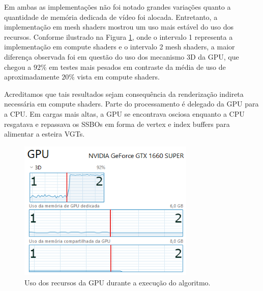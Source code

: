 Em ambas as implementações não foi notado grandes variações quanto a quantidade de memória dedicada de vídeo foi alocada. Entretanto, a implementação em mesh shaders mostrou um uso mais estável do uso dos recursos. Conforme ilustrado na Figura \ref{fig:LABEL_USO3D_GPU}, onde o intervalo 1 representa a implementação em compute shaders e o intervalo 2 mesh shaders, a maior diferença observada foi em questão do uso dos mecanismo 3D da GPU, que chegou a $92\%$ em testes mais pesados em contraste da média de uso de aproximadamente $20\%$ vista em compute shaders.

Acreditamos que tais resultados sejam consequência da renderização indireta necessária em compute shaders. Parte do processamento é delegado da GPU para a CPU. Em cargas mais altas, a GPU se encontrava osciosa enquanto a CPU resgatava e repassava os SSBOs em forma de vertex e index buffers para alimentar a esteira VGTs.


\begin{figure}
\centering
\includegraphics[width=0.75\textwidth]{imagens/Uso3DGPU.png}
\caption{Uso dos recursos da GPU durante a execução do algoritmo.}
\label{fig:LABEL_USO3D_GPU}
\end{figure}
